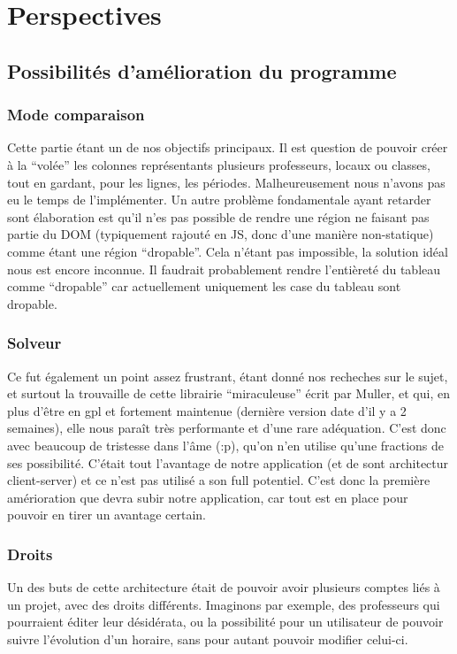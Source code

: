 \chapter{Perspectives}

\section{Possibilités d'amélioration du programme}

\subsection{Mode comparaison}
Cette partie étant un de nos objectifs principaux. Il est question de pouvoir créer à la
\enquote{volée} les colonnes représentants plusieurs professeurs, locaux ou classes, tout
en gardant, pour les lignes, les périodes. Malheureusement nous n'avons pas eu le temps de l'implémenter. Un autre problème fondamentale ayant retarder sont élaboration est qu'il n'es pas
possible de rendre une région ne faisant pas partie du DOM (typiquement rajouté
en JS, donc d'une manière non-statique) comme étant une région \enquote{dropable}.
Cela n'étant pas impossible, la solution idéal nous est encore inconnue. Il faudrait probablement rendre l'entièreté du tableau comme \enquote{dropable} car actuellement uniquement les case du tableau sont dropable.

\subsection{Solveur}
Ce fut également un point assez frustrant, étant donné nos recheches 
sur le sujet, et surtout la trouvaille de cette librairie ``miraculeuse'' écrit
par Muller, et qui, en plus d'être en gpl et fortement maintenue (dernière
version date d'il y a 2 semaines), elle nous paraît très performante et d'une
rare adéquation.  C'est donc avec beaucoup de tristesse dans l’âme (:p), qu'on n'en
utilise qu'une fractions de ses possibilité.  C'était tout l'avantage de notre
application (et de sont architectur client-server) et ce n'est pas utilisé a son
full potentiel.  C'est donc la première amérioration que devra subir notre
application, car tout est en place pour pouvoir en tirer un avantage certain.

\subsection{Droits}
Un des buts de cette architecture était de pouvoir avoir plusieurs comptes liés à
un projet, avec des droits différents. Imaginons par exemple, des professeurs qui pourraient
éditer leur désidérata, ou la possibilité pour un utilisateur de pouvoir suivre l'évolution d'un horaire, sans pour autant pouvoir modifier celui-ci.

